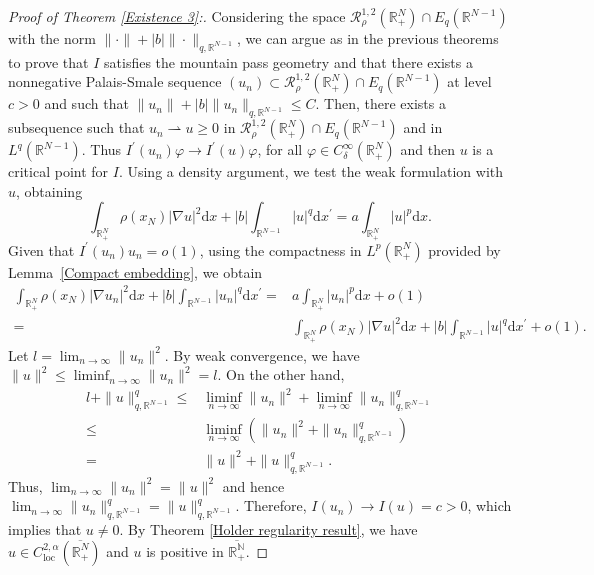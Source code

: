 \documentclass[12pt,reqno]{amsart}
\begin{document}
\begin{proof}[Proof of Theorem \ref{Existence 3}:] Considering the space $\mathcal{R}^{1,2}_\rho(\mathds{R}^N_+)\cap E_q(\mathds{R}^{N-1})$ with the norm $\|\cdot\|+|b|\|\cdot\|_{q,\mathds{R}^{N-1}}$, we can argue as in the previous theorems to prove that $I$ satisfies the mountain pass geometry and that there exists a nonnegative Palais-Smale sequence $(u_n)\subset \mathcal{R}^{1,2}_\rho(\mathds{R}^N_+)\cap E_q(\mathds{R}^{N-1})$ at level $c>0$ and such that $\|u_n\|+|b|\|u_n\|_{q,\mathds{R}^{N-1}}\leq C$. Then, there exists a subsequence such that $u_n \rightharpoonup u\geq 0$ in $\mathcal{R}^{1,2}_\rho(\mathds{R}^N_+)\cap E_q(\mathds{R}^{N-1})$ and in $L^q(\mathds{R}^{N-1})$. Thus $I^\prime(u_n)\varphi\longrightarrow I^\prime(u)\varphi$, for all $\varphi\in C^\infty_\delta(\mathds{R}^N_+)$ and then $u$ is a critical point for $I$. Using a density argument, we test the weak formulation with $u$, obtaining
\begin{equation*}
    \int_{\mathds{R}^N_+}\rho(x_N)|\nabla u|^2\mathrm{d}x+|b|\int_{\mathds{R}^{N-1}}|u|^q\mathrm{d}x^\prime=a\int_{\mathds{R}^N_+}|u|^p\mathrm{d}x.
\end{equation*}
Given that $I^\prime(u_n)u_n=o(1)$, using the compactness in $L^p(\mathds{R}^N_+)$ provided by Lemma~\ref{Compact embedding}, we obtain
\begin{align*}
\int_{\mathds{R}^N_+}\rho(x_N)|\nabla u_n|^2\mathrm{d}x+|b|\int_{\mathds{R}^{N-1}}|u_n|^q\mathrm{d}x^\prime=&a\int_{\mathds{R}^N_+}|u_n|^p\mathrm{d}x+o(1)\\
    =& \int_{\mathds{R}^N_+}\rho(x_N)|\nabla u|^2\mathrm{d}x+|b|\int_{\mathds{R}^{N-1}}|u|^q\mathrm{d}x^\prime+o(1).
\end{align*}
Let $l=\lim_{n\rightarrow \infty} \|u_n\|^2$. By weak convergence, we have $\|u\|^2\leq \liminf_{n\rightarrow \infty}\|u_n\|^2=l$. On the other hand,
\begin{align*}
    l+\|u\|_{q,\mathds{R}^{N-1}}^q\leq& \liminf_{n\rightarrow \infty} \|u_n\|^2+\liminf_{n\rightarrow \infty}\|u_n\|_{q,\mathds{R}^{N-1}}^q\\
    \leq& \liminf_{n\rightarrow \infty}(\|u_n\|^2+\|u_n\|_{q,\mathds{R}^{N-1}}^q)\\
    =& \|u\|^2+\|u\|_{q,\mathds{R}^{N-1}}^q.
\end{align*}
Thus, $\lim_{n\rightarrow \infty} \|u_n\|^2=\|u\|^2$ and hence $\lim_{n\rightarrow \infty}\|u_n\|_{q,\mathds{R}^{N-1}}^q=\|u\|_{q,\mathds{R}^{N-1}}^q$. Therefore, $I(u_n)\longrightarrow I(u)=c>0$, which implies that $u\neq 0$. By Theorem \ref{Holder regularity result}, we have $u\in C^{2,\alpha}_{\mathrm{loc}}(\overline{\mathds{R}^N_+})$ and $u$ is positive in $\overline{\mathds{R^N_+}}$.
\end{proof}
\end{document}
